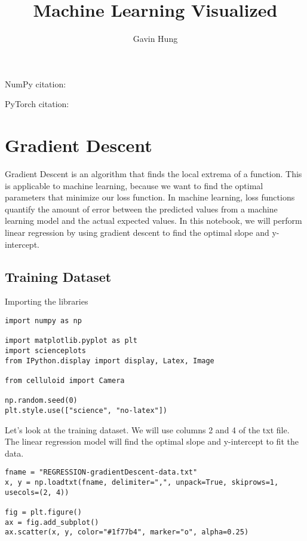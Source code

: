\documentclass[openany]{book}
\title{Machine Learning Visualized}
\author{Gavin Hung}
\begin{document}
\maketitle

\tableofcontents
    
NumPy citation: \cite{harris2020array}

PyTorch citation: \cite{paszke2017automatic}




    
    \section{Gradient Descent}\label{gradient-descent}

Gradient Descent is an algorithm that finds the local extrema of a
function. This is applicable to machine learning, because we want to
find the optimal parameters that minimize our loss function. In machine
learning, loss functions quantify the amount of error between the
predicted values from a machine learning model and the actual expected
values. In this notebook, we will perform linear regression by using
gradient descent to find the optimal slope and y-intercept.

    \subsection{Training Dataset}\label{training-dataset}

    Importing the libraries

\begin{tcolorbox}
\begin{verbatim}
import numpy as np

import matplotlib.pyplot as plt
import scienceplots
from IPython.display import display, Latex, Image

from celluloid import Camera

np.random.seed(0)
plt.style.use(["science", "no-latex"])
\end{verbatim}
\end{tcolorbox}

    Let's look at the training dataset. We will use columns 2 and 4 of the
txt file. The linear regression model will find the optimal slope and
y-intercept to fit the data.

\begin{tcolorbox}
\tiny
\begin{verbatim}
fname = "REGRESSION-gradientDescent-data.txt"
x, y = np.loadtxt(fname, delimiter=",", unpack=True, skiprows=1, usecols=(2, 4))

fig = plt.figure()
ax = fig.add_subplot()
ax.scatter(x, y, color="#1f77b4", marker="o", alpha=0.25)
\end{verbatim}
\end{tcolorbox}
        
\end{document}
